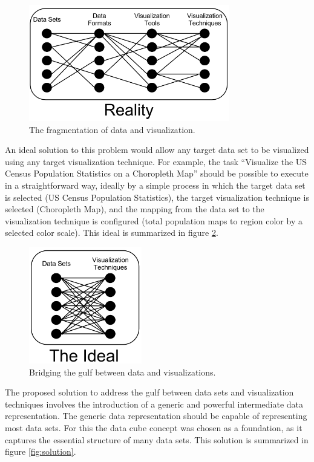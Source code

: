 \begin{figure}
  \centering
  \includegraphics[height=2in]{figs/Reality.png}
  \caption[Fragmentation of Data and Visualization.]
   {The fragmentation of data and visualization. }
  \label{fig:reality}
\end{figure}

An ideal solution to this problem would allow any target data set to be visualized using any target visualization technique. For example, the task ``Visualize the US Census Population Statistics on a Choropleth Map'' should be possible to execute in a straightforward way, ideally by a simple process in which the target data set is selected (US Census Population Statistics), the target visualization technique is selected (Choropleth Map), and the mapping from the data set to the visualization technique is configured (total population maps to region color by a selected color scale). This ideal is summarized in figure \ref{fig:ideal}.

\begin{figure}
  \centering
  \includegraphics[height=2in]{figs/Ideal.png}
  \caption[Bridging the Gulf between Data and Visualizations.]
   {Bridging the gulf between data and visualizations.}
  \label{fig:ideal}
\end{figure}

The proposed solution to address the gulf between data sets and visualization techniques involves the introduction of a generic and powerful intermediate data representation. The generic data representation should be capable of representing most data sets. For this the data cube concept was chosen as a foundation, as it captures the essential structure of many data sets. This solution is summarized in figure \ref{fig:solution}.

